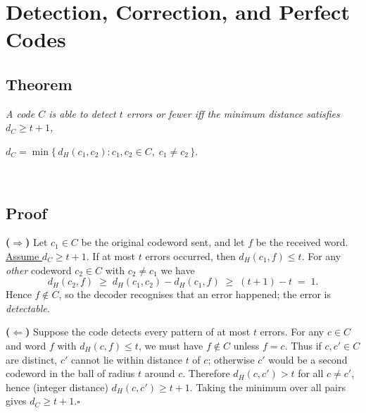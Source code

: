 \documentclass[docmute]{article}
\begin{document}
\section{Detection, Correction, and Perfect Codes}

\subsection*{Theorem}
\textit{A code $C$ is able to detect $t$ errors or fewer \emph{iff}
the minimum distance satisfies $d_C\ge t+1$,}\\[4pt]
\centerline{$d_C = \min\{\,d_H(c_1,c_2) : c_1,c_2\in C,\; c_1\neq c_2\,\}$.}\\[10pt]

\subsection*{Proof}

\textbf{($\Rightarrow$)}\;
Let $c_1\in C$ be the original codeword sent, and let $f$ be the received
word.  \underline{Assume $d_C\ge t+1$}.  
If at most $t$ errors occurred, then $d_H(c_1,f)\le t$.  
For any \emph{other} codeword $c_2\in C$ with $c_2\neq c_1$ we have
\[
  d_H(c_2,f)
  \;\ge\;
  d_H(c_1,c_2)-d_H(c_1,f)
  \;\ge\;
  (t+1)-t
  \;=\;
  1.
\]
Hence $f\notin C$, so the decoder recognises that an error happened; the
error is \textit{detectable}.

\begin{center}
\end{center}

\textbf{($\Leftarrow$)}\;
Suppose the code detects every pattern of at most $t$ errors.
For any $c\in C$ and word $f$ with $d_H(c,f)\le t$, we must
have $f\notin C$ unless $f=c$.  
Thus if $c,c'\in C$ are distinct, $c'$ cannot lie within
distance $t$ of $c$; otherwise $c'$ would be a second codeword in the ball
of radius $t$ around $c$.  Therefore $d_H(c,c')>t$ for all $c\neq c'$,
hence (integer distance) $d_H(c,c')\ge t+1$.  Taking the minimum over all
pairs gives $d_C\ge t+1$.\hfill$\square$
\end{document}

